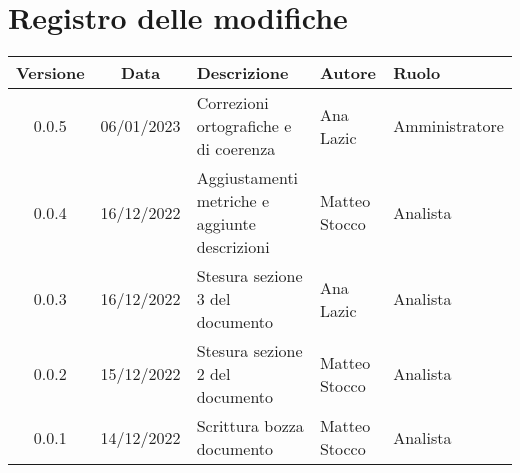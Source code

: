 \section*{Registro delle modifiche}
\begin{table}[H]
	\centering
	\renewcommand\tabularxcolumn[1]{>{\Centering}m{#1}}
	\begin{tabularx}{\textwidth}{| c | c | X | X | X |} 
	\hline
	\textbf{Versione} & \textbf{Data} & \textbf{Descrizione} & \textbf{Autore} & \textbf{Ruolo}\\
    	\hline
	0.0.5 & 06/01/2023 & Correzioni ortografiche e di coerenza & Ana Lazic & Amministratore \\
	\hline
	0.0.4 & 16/12/2022 & Aggiustamenti metriche e aggiunte descrizioni & Matteo Stocco & Analista \\
     	\hline
	0.0.3 & 16/12/2022 & Stesura sezione 3 del documento & Ana Lazic & Analista \\
	\hline
	0.0.2 & 15/12/2022 & Stesura sezione 2 del documento & Matteo Stocco & Analista \\
	\hline
	0.0.1 & 14/12/2022 & Scrittura bozza documento & Matteo Stocco & Analista \\
	\hline
	\end{tabularx}
\end{table}
